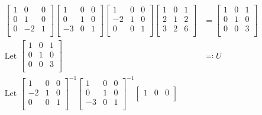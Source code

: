 \documentclass{article}
\begin{document}
\begin{align*}
    \begin{bmatrix}
        1 &0  &0   \\
         0&1  &0   \\
         0&-2  &1   \\
    \end{bmatrix}\begin{bmatrix}
        1 &0  &0   \\
         0&1  &0   \\
         -3&0  &1   \\
    \end{bmatrix}\begin{bmatrix}
        1 &0  &0   \\
         -2&1  &0   \\
         0&0  &1   \\
    \end{bmatrix}\begin{bmatrix}
        1 &0  &1   \\
         2& 1 &2   \\
         3&2  &6   \\
    \end{bmatrix}&=\begin{bmatrix}
        1 &0  &1   \\
         0&1  &0   \\
         0&0  &3   \\
    \end{bmatrix}\\
    \text{Let }\begin{bmatrix}
        1 &0  &1   \\
         0&1  &0   \\
         0&0  &3   \\
    \end{bmatrix}&\eqqcolon  U\\
    \text{Let }\begin{bmatrix}
        1 &0  &0   \\
         -2&1  &0   \\
         0&0  &1   \\
    \end{bmatrix}^{-1}\begin{bmatrix}
        1 &0  &0   \\
         0&1  &0   \\
         -3&0  &1   \\
    \end{bmatrix}^{-1}\begin{bmatrix}
        1 &0  &0   \\

\end{bmatrix}
\end{align*}
\end{document}
